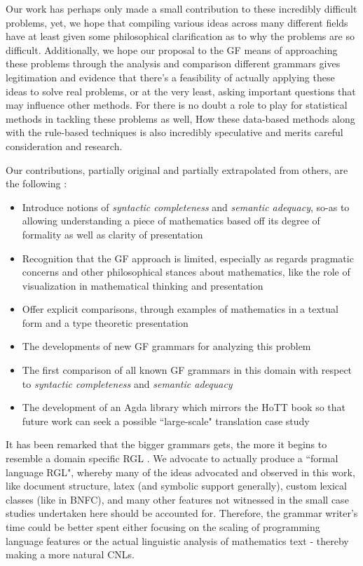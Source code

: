 Our work has perhaps only made a small contribution to these incredibly
difficult problems, yet, we hope that compiling various ideas across many
different fields have at least given some philosophical clarification as to why
the problems are so difficult. Additionally, we hope our proposal to the GF
means of approaching these problems through the analysis and comparison
different grammars gives legitimation and evidence that there's a feasibility of
actually applying these ideas to solve real problems, or at the very least,
asking important questions that may influence other methods. For there is no
doubt a role to play for statistical methods in tackling these problems as well,
How these data-based methods along with the rule-based techniques is
also incredibly speculative and merits careful consideration and research.

Our contributions, partially original and partially extrapolated from others,
are the following :

\begin{itemize}
\item Introduce notions of \emph{syntactic completeness} and \emph{semantic adequacy}, so-as to
allowing understanding a piece of mathematics based off its degree of formality
as well as clarity of presentation
\item Recognition that the GF approach is limited, especially as regards pragmatic
concerns and other philosophical stances about mathematics, like the role of
visualization in mathematical thinking and presentation
\item Offer explicit comparisons, through examples of mathematics in a textual form and a type
  theoretic presentation
\item The developments of new GF grammars for analyzing this problem
\item The first comparison of all known GF grammars in this domain with respect
  to \emph{syntactic completeness} and \emph{semantic adequacy}
\item The development of an Agda library which mirrors the HoTT book so that
  future work can seek a possible ``large-scale" translation case study
\end{itemize}


 It has been remarked that the bigger grammars gets, the more it begins to
resemble a domain specific RGL \cite{angelovSS}. We advocate to actually produce
a ``formal language RGL", whereby many of the ideas advocated and observed in
this work, like document structure, latex (and symbolic support generally),
custom lexical classes (like in BNFC), and many other features not witnessed in
the small case studies undertaken here should be accounted for. Therefore, the
grammar writer's time could be better spent either focusing on the scaling of
programming language features or the actual linguistic analysis of
mathematics text - thereby making a more natural CNLs.

